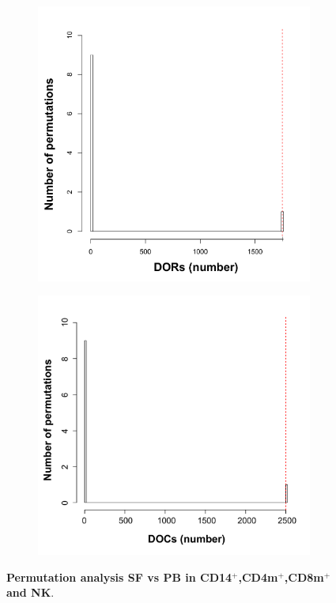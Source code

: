 \begin{figure}[H]
\begin{subfigure}[b]{0.45\textwidth}
\caption{}
\end{subfigure}
~
\begin{subfigure}[b]{0.45\textwidth} 
\centering
\includegraphics[width=\textwidth]{./Appendix/pdfs/Chapter5/ATAC_PsA_CD8_permutation_analysis}%
\caption{}
\end{subfigure}
\begin{subfigure}[b]{0.45\textwidth} 
\centering
\includegraphics[width=\textwidth]{./Appendix/pdfs/Chapter5/ATAC_PsA_NK_permutation_analysis}%
\caption{}
\end{subfigure}
\caption[Permutation analysis SF vs PB in CD14$^+$,CD4m$^+$,CD8m$^+$ and NK.]{\textbf{Permutation analysis SF vs PB in CD14$^+$,CD4m$^+$,CD8m$^+$ and NK}. }
\label{figure:PsA_perm_analysis}
\end{figure}

